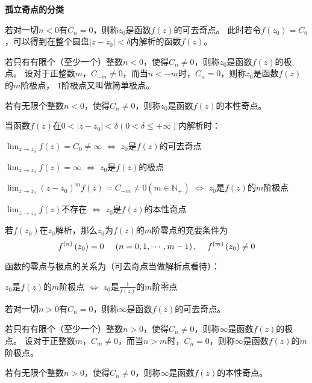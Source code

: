 \documentclass[a4paper,12pt]{article}
\begin{document}
\noindent
\textbf{孤立奇点的分类}

若对一切$n<0$有$C_n=0$，则称$z_0$是函数$f\left(z\right)$的可去奇点。
此时若令$f\left(z_0\right)=C_0$，可以得到在整个圆盘$\left|z-z_0\right|<\delta$内解析的函数$f\left(z\right)$。

若只有有限个（至少一个）整数$n<0$，使得$C_n\ne0$，则称$z_0$是函数$f\left(z\right)$的极点。
设对于正整数$m$，$C_{-m}\ne0$，而当$n<-m$时，$C_n=0$，则称$z_0$是函数$f\left(z\right)$的$m$阶极点，
$1$阶极点又叫做简单极点。

若有无限个整数$n<0$，使得$C_n\ne0$，则称$z_0$是函数$f\left(z\right)$的本性奇点。

当函数$f\left(z\right)$在$0<\left|z-z_0\right|<\delta\left(0<\delta\le+\infty\right)$内解析时：
\begin{center}
    $\lim_{z\to z_0}f\left(z\right)=C_0\ne\infty$
    $\Longleftrightarrow$
    $z_0$是$f\left(z\right)$的可去奇点

    $\lim_{z\to z_0}f\left(z\right)=\infty$
    $\Longleftrightarrow$
    $z_0$是$f\left(z\right)$的极点

    $\lim_{z\to z_0}\left(z-z_0\right)^mf\left(z\right)=C_{-m}\ne0\left(m\in\mathbb{N}_+\right)$
    $\Longleftrightarrow$
    $z_0$是$f\left(z\right)$的$m$阶极点

    $\lim_{z\to z_0}f\left(z\right)$不存在
    $\Longleftrightarrow$
    $z_0$是$f\left(z\right)$的本性奇点
\end{center}

若$f\left(z_0\right)$在$z_0$解析，那么$z_0$为$f\left(z\right)$的$m$阶零点的充要条件为
$$
f^{\left(n\right)}\left(z_0\right)=0\kern 12pt
\left(n=0,1,\cdots,m-1\right),\kern 12pt
f^{\left(m\right)}\left(z_0\right)\ne0
$$

函数的零点与极点的关系为（可去奇点当做解析点看待）：
\begin{center}
    $z_0$是$f\left(z\right)$的$m$阶极点
    $\Longleftrightarrow$
    $z_0$是$\frac1{f\left(z\right)}$的$m$阶零点
\end{center}

若对一切$n>0$有$C_n=0$，则称$\infty$是函数$f\left(z\right)$的可去奇点。

若只有有限个（至少一个）整数$n>0$，使得$C_n\ne0$，则称$\infty$是函数$f\left(z\right)$的极点。
设对于正整数$m$，$C_m\ne0$，而当$n>m$时，$C_n=0$，则称$\infty$是函数$f\left(z\right)$的$m$阶极点。

若有无限个整数$n>0$，使得$C_n\ne0$，则称$\infty$是函数$f\left(z\right)$的本性奇点。
\end{document}
